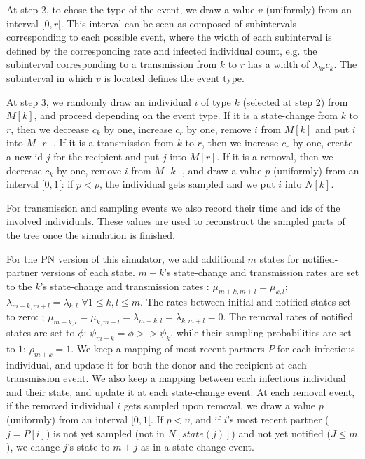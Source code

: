 \documentclass[10pt,letterpaper]{article}
\begin{document}
At step 2, to chose the type of the event, we draw a value $v$ (uniformly) from an interval $[0, r[$. This interval can be seen as composed of subintervals corresponding to each possible event, where the width of each subinterval is defined by the corresponding rate and infected individual count, e.g. the subinterval corresponding to a transmission from $k$ to $r$ has a width of $\lambda_{kr}c_k$. The subinterval in which $v$ is located defines the event type.

At step 3, we randomly draw an individual $i$ of type $k$ (selected at step 2) from $M[k]$, and proceed depending on the event type. If it is a state-change from $k$ to $r$, then we decrease $c_k$ by one, increase $c_r$ by one, remove $i$ from $M[k]$ and put $i$ into $M[r]$. If it is a transmission from $k$ to $r$, then we increase $c_r$ by one, create a new id $j$ for the recipient and put $j$ into $M[r]$. If it is a removal, then we decrease $c_k$ by one, remove $i$ from $M[k]$, and draw a value $p$ (uniformly) from an interval $[0, 1[$: if $p < \rho$, the individual gets sampled and we put $i$ into $N[k]$. 

For transmission and sampling events we also record their time and ids of the involved individuals. These values are used to reconstruct the sampled parts of the tree once the simulation is finished.


For the PN version of this simulator, we add additional $m$ states for notified-partner versions of each state. $m + k$'s state-change and transmission rates are set to the $k$'s state-change and transmission rates : $\mu_{m+k,m+l} = \mu_{k,l}$; $\lambda_{m+k,m+l} = \lambda_{k,l}$ $\forall 1 \leq  k,l \leq m$. The rates between initial and notified states set to zero: ;  $\mu_{m+k,l} = \mu_{k,m+l} = \lambda_{m+k,l} = \lambda_{k,m+l} = 0$. The removal rates of notified states are set to $\phi$: $\psi_{m+k} = \phi >> \psi_k$, while their sampling probabilities are set to $1$: $\rho_{m+k} = 1$. We keep a mapping of most recent partners $P$ for each infectious individual, and update it for both the donor and the recipient at each transmission event. We also keep a mapping between each infectious individual and their state, and update it at each state-change event. At each removal event, if the removed individual $i$ gets sampled upon removal, we draw a value $p$ (uniformly) from an interval $[0, 1[$. If $p < \upsilon$, and if $i$'s most recent partner ($j = P[i]$) is not yet sampled (not in $N[state(j)]$) and not yet notified ($J \leq m$), we change $j$'s state to $m + j$ as in a state-change event.
\end{document}
